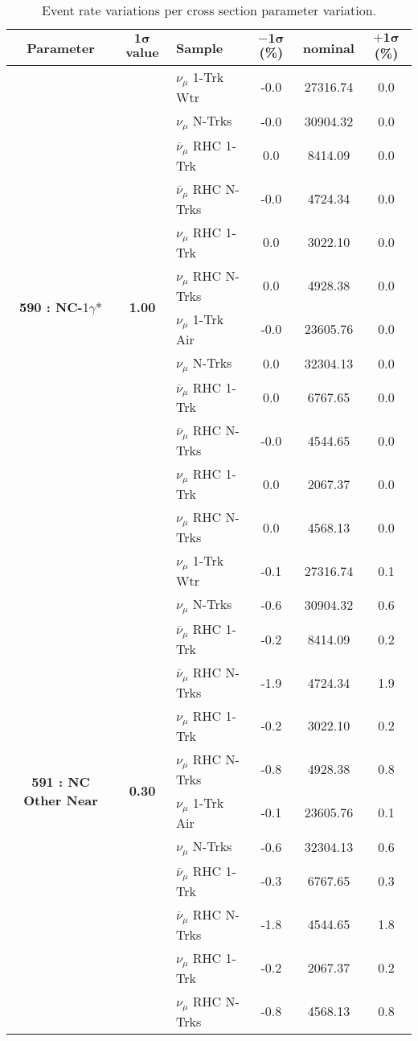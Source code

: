 \begin{table}[ht!]
\centering
\begin{tabular}{ c  c  l  c  c  c }
\midrule[1.3pt]
\textbf{Parameter} & \textbf{$\mathbf{1\sigma}$ value} & \textbf{Sample} & \textbf{$\mathbf{-1\sigma}$ (\%)}  &  \textbf{nominal}  &  \textbf{$\mathbf{+1\sigma}$ (\%)} \\
\midrule[1.3pt]
\multirow{12}{*}{\textbf{590 : NC-}1$\gamma$*}& \multirow{12}{*}{\textbf{1.00}} & $\nu_\mu$ 1-Trk Wtr &   -0.0 &  27316.74 &   0.0 \\ 
 &  & $\nu_\mu$ N-Trks &   -0.0 &  30904.32 &   0.0 \\ 
 &  & $\overline{\nu}_\mu$ RHC 1-Trk &   0.0 &  8414.09 &   0.0 \\ 
 &  & $\overline{\nu}_\mu$ RHC N-Trks &   -0.0 &  4724.34 &   0.0 \\ 
 &  & $\nu_\mu$ RHC 1-Trk &   0.0 &  3022.10 &   0.0 \\ 
 &  & $\nu_\mu$ RHC N-Trks &   0.0 &  4928.38 &   0.0 \\ 
 &  & $\nu_\mu$ 1-Trk Air &   -0.0 &  23605.76 &   0.0 \\ 
 &  & $\nu_\mu$ N-Trks &   0.0 &  32304.13 &   0.0 \\ 
 &  & $\overline{\nu}_\mu$ RHC 1-Trk &   0.0 &  6767.65 &   0.0 \\ 
 &  & $\overline{\nu}_\mu$ RHC N-Trks &   -0.0 &  4544.65 &   0.0 \\ 
 &  & $\nu_\mu$ RHC 1-Trk &   0.0 &  2067.37 &   0.0 \\ 
 &  & $\nu_\mu$ RHC N-Trks &   0.0 &  4568.13 &   0.0 \\ 
\midrule[1.3pt]
\multirow{12}{*}{\textbf{591 : NC Other Near}} & \multirow{12}{*}{\textbf{0.30}} & $\nu_\mu$ 1-Trk Wtr &   -0.1 &  27316.74 &   0.1 \\ 
 &  & $\nu_\mu$ N-Trks &   -0.6 &  30904.32 &   0.6 \\ 
 &  & $\overline{\nu}_\mu$ RHC 1-Trk &   -0.2 &  8414.09 &   0.2 \\ 
 &  & $\overline{\nu}_\mu$ RHC N-Trks &   -1.9 &  4724.34 &   1.9 \\ 
 &  & $\nu_\mu$ RHC 1-Trk &   -0.2 &  3022.10 &   0.2 \\ 
 &  & $\nu_\mu$ RHC N-Trks &   -0.8 &  4928.38 &   0.8 \\ 
 &  & $\nu_\mu$ 1-Trk Air &   -0.1 &  23605.76 &   0.1 \\ 
 &  & $\nu_\mu$ N-Trks &   -0.6 &  32304.13 &   0.6 \\ 
 &  & $\overline{\nu}_\mu$ RHC 1-Trk &   -0.3 &  6767.65 &   0.3 \\ 
 &  & $\overline{\nu}_\mu$ RHC N-Trks &   -1.8 &  4544.65 &   1.8 \\ 
 &  & $\nu_\mu$ RHC 1-Trk &   -0.2 &  2067.37 &   0.2 \\ 
 &  & $\nu_\mu$ RHC N-Trks &   -0.8 &  4568.13 &   0.8 \\ 
\midrule[1.3pt]
\end{tabular}
\centering
\caption*{Event rate variations per cross section parameter variation.}
\end{table}
\addtocounter{table}{-1}

